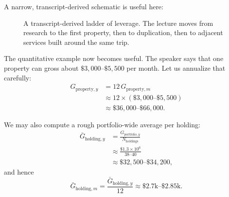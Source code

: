 A narrow, transcript-derived schematic is useful here:

\begin{figure}[t]
\centering
{}
\caption{A transcript-derived ladder of leverage. The lecture moves from research to the first property, then to duplication, then to adjacent services built around the same trip.}
\end{figure}

The quantitative example now becomes useful. The speaker says that one property can gross about \(\$3{,}000\text{--}\$5{,}500\) per month. Let us annualize that carefully:
\begin{align}
G_{\mathrm{property},y}
&= 12\,G_{\mathrm{property},m} \\
&\approx 12 \times (\$3{,}000\text{--}\$5{,}500) \\
&\approx \$36{,}000\text{--}\$66{,}000.
\end{align}

We may also compute a rough portfolio-wide average per holding:
\begin{align}
\bar G_{\mathrm{holding},y}
&= \frac{G_{\mathrm{portfolio},y}}{N_{\mathrm{holdings}}} \\
&\approx \frac{\$1.3\times 10^6}{38\text{--}40} \\
&\approx \$32{,}500\text{--}\$34{,}200,
\end{align}
and hence
\begin{equation}
\bar G_{\mathrm{holding},m}
=
\frac{\bar G_{\mathrm{holding},y}}{12}
\approx \$2.7\text{k}\text{--}\$2.85\text{k}.
\end{equation}

